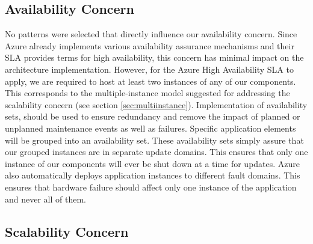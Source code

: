 \subsection{Availability Concern}
No patterns were selected that directly influence our availability concern. Since Azure already implements various availability assurance mechanisms and their SLA provides terms for high availability, this concern has minimal impact on the architecture implementation. However, for the Azure High Availability SLA to apply, we are required to host at least two instances of any of our components. This corresponds to the multiple-instance model suggested for addressing the scalability concern (see section \ref{sec:multiinstance}). Implementation of availability sets, should be used to ensure redundancy and remove the impact of planned or unplanned maintenance events as well as failures. Specific application elements will be grouped into an availability set. These availability sets simply assure that our grouped instances are in separate update domains. This ensures that only one instance of our components will ever be shut down at a time for updates. Azure also automatically deploys application instances to different fault domains. This ensures that hardware failure should affect only one instance of the application and never all of them. 


\subsection{Scalability Concern}


